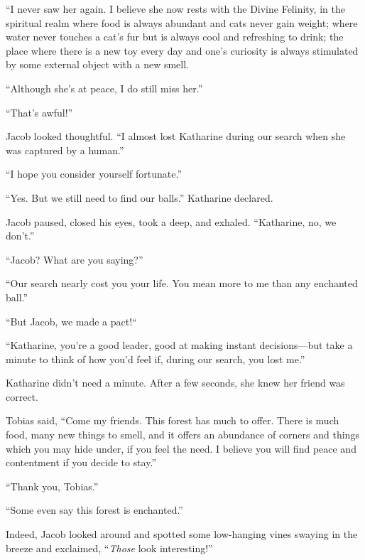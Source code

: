 “I never saw her again. I believe she now rests with the Divine Felinity, in the spiritual realm where food is always abundant and cats never gain weight; where water never touches a cat's fur but is always cool and refreshing to drink; the place where there is a new toy every day and one's curiosity is always stimulated by some external object with a new smell.

“Although she's at peace, I do still miss her.”

“That's awful!”

Jacob looked thoughtful. “I almost lost Katharine during our search when she was captured by a human.”

“I hope you consider yourself fortunate.”

“Yes. But we still need to find our balls.” Katharine declared.

Jacob paused, closed his eyes, took a deep, and exhaled. “Katharine, no, we don't.”

“Jacob? What are you saying?”

“Our search nearly cost you your life. You mean more to me than any enchanted ball.”

“But Jacob, we made a pact!“

“Katharine, you're a good leader, good at making instant decisions—but take a minute to think of how you'd feel if, during our search, you lost me.”

Katharine didn't need a minute. After a few seconds, she knew her friend was correct.

Tobias said, “Come my friends. This forest has much to offer. There is much food, many new things to smell, and it offers an abundance of corners and things which you may hide under, if you feel the need. I believe you will find peace and contentment if you decide to stay.”

“Thank you, Tobias.”

“Some even say this forest is enchanted.”

Indeed, Jacob looked around and spotted some low-hanging vines swaying in the breeze and exclaimed, “\textit{Those} look interesting!”